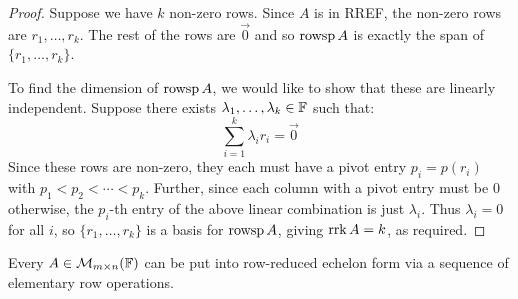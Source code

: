 \documentclass[../main.tex]{subfiles}
\begin{document}
\begin{proof}
  Suppose we have $k$ non-zero rows.
  Since $A$ is in RREF, the non-zero rows are $r_1, \ldots, r_k$.
  The rest of the rows are $\vec{0}$ and so $\operatorname{rowsp} A$ is exactly the span of $\{r_1, \ldots, r_k\}$.

  To find the dimension of $\operatorname{rowsp} A$, we would like to show that these are linearly independent.
  Suppose there exists $\lambda_1, \ldots, \lambda_k \in \mathbb{F}$ such that:
  \[
    \sum_{i = 1}^{k} \lambda_i r_i = \vec{0}
  \]
  Since these rows are non-zero, they each must have a pivot entry $p_i = p(r_i)$ with $p_1 < p_2 < \cdots < p_k$.
  Further, since each column with a pivot entry must be 0 otherwise, the $p_i$-th entry of the above linear combination is just $\lambda_i$.
  Thus $\lambda_i = 0$ for all $i$, so $\{r_1, \ldots, r_k\}$ is a basis for $\operatorname{rowsp} A$, giving $\operatorname{rrk} A = k$, as required.
\end{proof}
\begin{proposition}
  Every $A \in \mathcal{M}_{m\times n}(\mathbb{F})$ can be put into row-reduced echelon form via a sequence of elementary row operations. \label{gaussElim}
\end{proposition}
\end{document}
